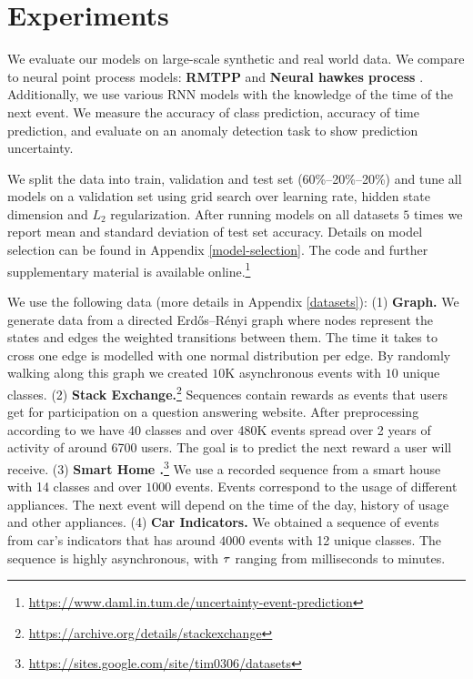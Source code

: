 \section{Experiments}\label{experiments}

We evaluate our models on large-scale synthetic and real world data. We compare to neural point process models: \textbf{RMTPP} \cite{RMTPP} and \textbf{Neural hawkes process} \cite{hawkes}. Additionally, we use various RNN models with the knowledge of the time of the next event. We measure the accuracy of class prediction, accuracy of time prediction, and evaluate on an anomaly detection task to show prediction uncertainty.

We split the data into train, validation and test set (60\%--20\%--20\%) and tune all models on a validation set using grid search over learning rate, hidden state dimension and $L_2$ regularization. After running models on all datasets $5$ times we report mean and standard deviation of test set accuracy. Details on model selection can be found in Appendix \ref{model-selection}. The code and further supplementary material is available online.\footnote{\url{https://www.daml.in.tum.de/uncertainty-event-prediction}}

We use the following data (more details in Appendix \ref{datasets}): (1) \textbf{Graph.} We generate data from a directed Erdős–Rényi graph where nodes represent the states and edges the weighted transitions between them. The time it takes to cross one edge is modelled with one normal distribution per edge. By randomly walking along this graph we created $10$K asynchronous events with $10$ unique classes.
(2) \textbf{Stack Exchange.}\footnote{\url{https://archive.org/details/stackexchange}} Sequences contain rewards as events that users get for participation on a question answering website. After preprocessing according to \cite{RMTPP} we have 40 classes and over 480K events spread over 2 years of activity of around 6700 users. The goal is to predict the next reward a user will receive.
(3) \textbf{Smart Home \normalfont\cite{SmartHome}.}\footnote{\url{https://sites.google.com/site/tim0306/datasets}} We use a recorded sequence from a smart house with 14 classes and over $1000$ events. Events correspond to the usage of different appliances. The next event will depend on the time of the day, history of usage and other appliances.
(4) \textbf{Car Indicators.} We obtained a sequence of events from car's indicators that has around $4000$ events with 12 unique classes. The sequence is highly asynchronous, with $\tau$ ranging from milliseconds to minutes.

\label{visualization}

\label{event_prediction}

\label{time_prediction}

\label{anomaly_detection}
